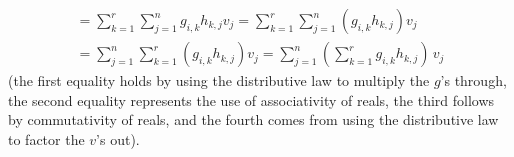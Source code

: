 \begin{exercises}
\begin{answer}
\begin{exparts}
\begin{multline*}
              =\sum_{k=1}^r \sum_{j=1}^n g_{i,k}h_{k,j}v_j   
              =\sum_{k=1}^r \sum_{j=1}^n (g_{i,k}h_{k,j})v_j
                                                              \\ 
              =\sum_{j=1}^n \sum_{k=1}^r (g_{i,k}h_{k,j})v_j 
              =\sum_{j=1}^n (\sum_{k=1}^r g_{i,k}h_{k,j})\,v_j
           \end{multline*}
           (the first equality holds by using the distributive law to multiply
           the $g$'s through, the second equality represents the use of 
           associativity of reals, the third follows by commutativity of
           reals, and the fourth comes from using 
           the distributive law to factor the $v$'s out).
       \end{exparts} 
    \end{answer}
\end{exercises}





















